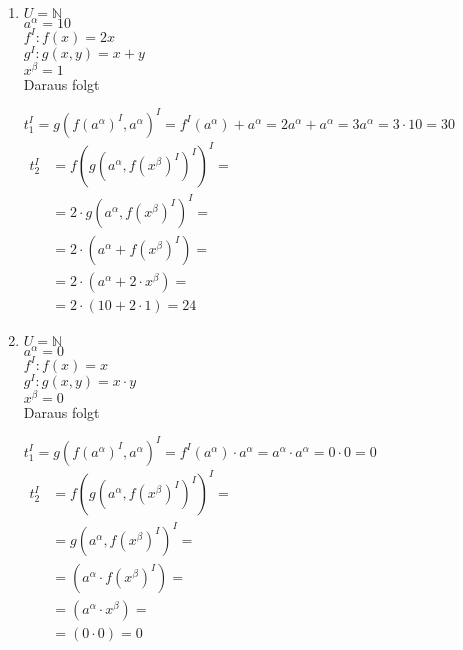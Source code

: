 \documentclass[10pt, oneside]{article}
\begin{document}
\begin{enumerate}
    \item
        $U = \mathbb{N}$ \\[5pt]
        $a^{\alpha} = 10$ \\[5pt]
        $f^I : f(x) = 2x$ \\[5pt]
        $g^I : g(x, y) = x + y$ \\[5pt]
        $x^{\beta} = 1$ \\[5pt]

        Daraus folgt

        $t_1^I = g(f(a^{\alpha})^I, a^{\alpha})^I = f^I(a^{\alpha}) + a^{\alpha} = 2a^{\alpha} + a^{\alpha} = 3a^{\alpha} = 3 \cdot 10 = 30$ \\[5pt]
        $\begin{aligned}
            t_2^I &= f(g(a^{\alpha}, f(x^{\beta})^I)^I)^I = \\
                  &= 2 \cdot g(a^{\alpha}, f(x^{\beta})^I)^I = \\
                  &= 2 \cdot (a^{\alpha} + f(x^{\beta})^{I}) = \\
                  &= 2 \cdot (a^{\alpha} + 2 \cdot x^{\beta}) = \\
                  &= 2 \cdot (10 + 2 \cdot 1) = 24
        \end{aligned}$

    \item
        $U = \mathbb{N}$ \\[5pt]
        $a^{\alpha} = 0$ \\[5pt]
        $f^I : f(x) = x$ \\[5pt]
        $g^I : g(x, y) = x \cdot y$ \\[5pt]
        $x^{\beta} = 0$ \\[5pt]

        Daraus folgt

        $t_1^I = g(f(a^{\alpha})^I, a^{\alpha})^I = f^I(a^{\alpha}) \cdot a^{\alpha} = a^{\alpha} \cdot a^{\alpha} = 0 \cdot 0 = 0$ \\[5pt]
        $\begin{aligned}
            t_2^I &= f(g(a^{\alpha}, f(x^{\beta})^I)^I)^I = \\
                  &= g(a^{\alpha}, f(x^{\beta})^I)^I = \\
                  &= (a^{\alpha} \cdot f(x^{\beta})^{I}) = \\
                  &= (a^{\alpha} \cdot x^{\beta}) = \\
                  &= (0 \cdot 0) = 0
        \end{aligned}$
\end{enumerate}
\end{document}
